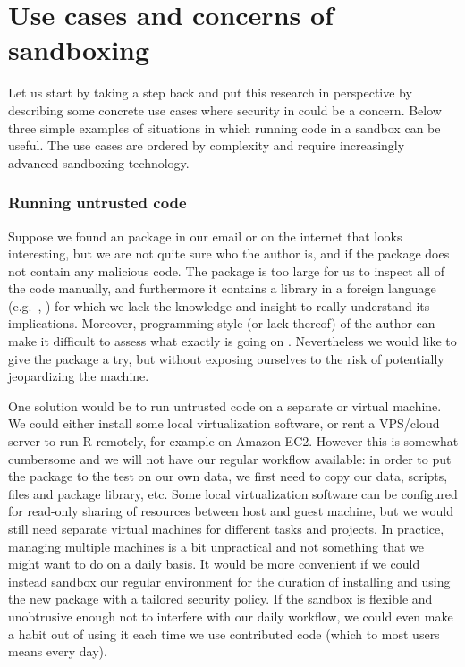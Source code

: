 \section{Use cases and concerns of sandboxing \R}

Let us start by taking a step back and put this research in perspective by
describing some concrete use cases where security in \R could be a concern.
Below three simple examples of situations in which running \R code in a sandbox
can be useful. The use cases are ordered by complexity and require increasingly
advanced sandboxing technology.


\subsubsection{Running untrusted code}

Suppose we found an \R package in our email or on the internet that looks
interesting, but we are not quite sure who the author is, and if the package
does not contain any malicious code. The package is too large for us to inspect
all of the code manually, and furthermore it contains a library in a foreign
language (e.g.\ \Cpp, \Fortran) for which we lack the knowledge and insight to
really understand its implications. Moreover, programming style (or lack
thereof) of the author can make it difficult to assess what exactly is going on
\citep{ioccc}. Nevertheless we would like to give the package a try, but without
exposing ourselves to the risk of potentially jeopardizing the machine.

One solution would be to run untrusted code on a separate or virtual machine.
We could either install some local virtualization software, or rent a VPS/cloud
server to run R remotely, for example on Amazon EC2. However this is somewhat
cumbersome and we will not have our regular workflow available: in order to put
the package to the test on our own data, we first need to copy our data,
scripts, files and package library, etc. Some local virtualization software can
be configured for read-only sharing of resources between host and guest machine,
but we would still need separate virtual machines for different tasks and
projects. In practice, managing multiple machines is a bit unpractical and not
something that we might want to do on a daily basis. It would be more convenient
if we could instead sandbox our regular \R environment for the duration of
installing and using the new package with a tailored security policy. If the
sandbox is flexible and unobtrusive enough not to interfere with our daily
workflow, we could even make a habit out of using it each time we use
contributed code (which to most users means every day).

